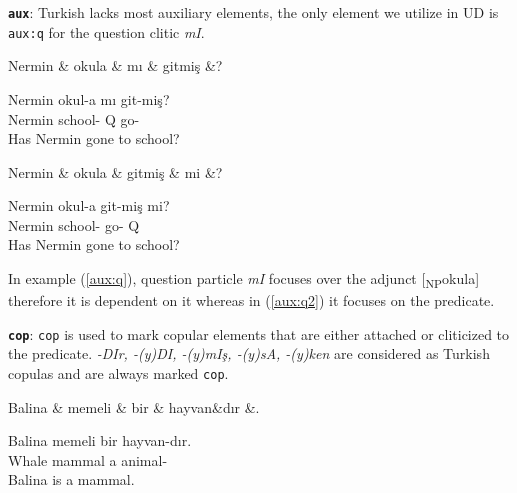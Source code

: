 \documentclass[11pt,a4paper]{article}
\begin{document}
\textbf{\texttt{aux}}:
Turkish lacks most auxiliary elements, the only element we utilize in UD is \texttt{aux:q} for the question clitic \textit{mI}.

\begin{exe}
\ex \label{aux:q}
\begin{dependency}
\begin{deptext}[column sep=0.32cm]
Nermin \& okula \& mı \& gitmiş \&? \\
\end{deptext}
\end{dependency}
\gll Nermin okul-a mı git-miş?  \\
Nermin school-\Dat{} Q go-\Pst{} \\
\glt Has Nermin gone to school?
\end{exe}

\begin{exe}
\ex \label{aux:q2}
\begin{dependency}
\begin{deptext}[column sep=0.32cm]
Nermin \& okula \& gitmiş \& mi \&? \\
\end{deptext}
\end{dependency}
\gll Nermin okul-a git-miş mi?  \\
Nermin school-\Dat{} go-\Pst{} Q \\
\glt Has Nermin gone to school?
\end{exe}

In example (\ref{aux:q}), question particle \textit{mI} focuses over the adjunct [\textsubscript{NP}okula] therefore it is dependent on it whereas in (\ref{aux:q2}) it focuses on the predicate. 

\textbf{\texttt{cop}}:
\texttt{cop} is used to mark copular elements that are either attached or cliticized to the predicate. \textit{-DIr, -(y)DI, -(y)mIş, -(y)sA, -(y)ken} are considered as Turkish copulas and are always marked \texttt{cop}. 

\begin{exe}
\ex \label{cop}
\begin{dependency}
\begin{deptext}[column sep=0.32cm]
Balina \& memeli \& bir \& hayvan\&dır \&. \\
\end{deptext}
\end{dependency}
\gll Balina memeli bir hayvan-dır.  \\
Whale mammal a animal-\Cop{} \\
\glt Balina is a mammal.
\end{exe}
\end{document}
